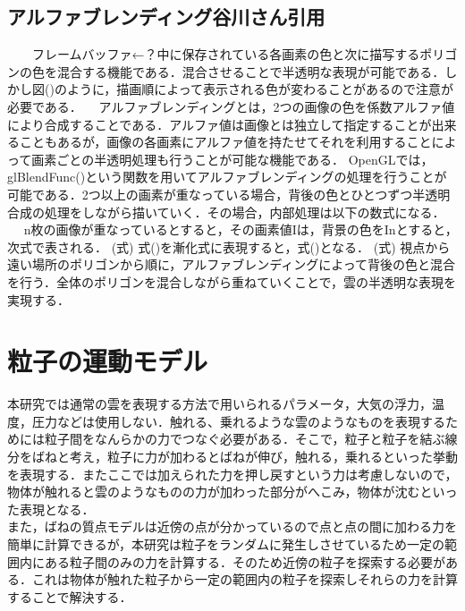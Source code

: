 \documentclass[11pt]{jreport}
\begin{document}
\subsection{アルファブレンディング谷川さん引用}
　　フレームバッファ←？中に保存されている各画素の色と次に描写するポリゴンの色を混合する機能である．混合させることで半透明な表現が可能である．しかし図()のように，描画順によって表示される色が変わることがあるので注意が必要である．
　アルファブレンディングとは，2つの画像の色を係数アルファ値により合成することである．アルファ値は画像とは独立して指定することが出来ることもあるが，画像の各画素にアルファ値を持たせてそれを利用することによって画素ごとの半透明処理も行うことが可能な機能である．
 OpenGLでは，glBlendFunc()という関数を用いてアルファブレンディングの処理を行うことが可能である．2つ以上の画素が重なっている場合，背後の色とひとつずつ半透明合成の処理をしながら描いていく．その場合，内部処理は以下の数式になる．
　 n枚の画像が重なっているとすると，その画素値Iは，背景の色をInとすると，次式で表される．
(式)
式()を漸化式に表現すると，式()となる．
(式)
視点から遠い場所のポリゴンから順に，アルファブレンディングによって背後の色と混合を行う．全体のポリゴンを混合しながら重ねていくことで，雲の半透明な表現を実現する．

\section{粒子の運動モデル}
 本研究では通常の雲を表現する方法で用いられるパラメータ，大気の浮力，温度，圧力などは使用しない．触れる、乗れるような雲のようなものを表現するためには粒子間をなんらかの力でつなぐ必要がある．そこで，粒子と粒子を結ぶ線分をばねと考え，粒子に力が加わるとばねが伸び，触れる，乗れるといった挙動を表現する．またここでは加えられた力を押し戻すという力は考慮しないので，物体が触れると雲のようなものの力が加わった部分がへこみ，物体が沈むといった表現となる．\\
 また，ばねの質点モデルは近傍の点が分かっているので点と点の間に加わる力を簡単に計算できるが，本研究は粒子をランダムに発生しさせているため一定の範囲内にある粒子間のみの力を計算する．そのため近傍の粒子を探索する必要がある．これは物体が触れた粒子から一定の範囲内の粒子を探索しそれらの力を計算することで解決する．\\
　
\end{document}
